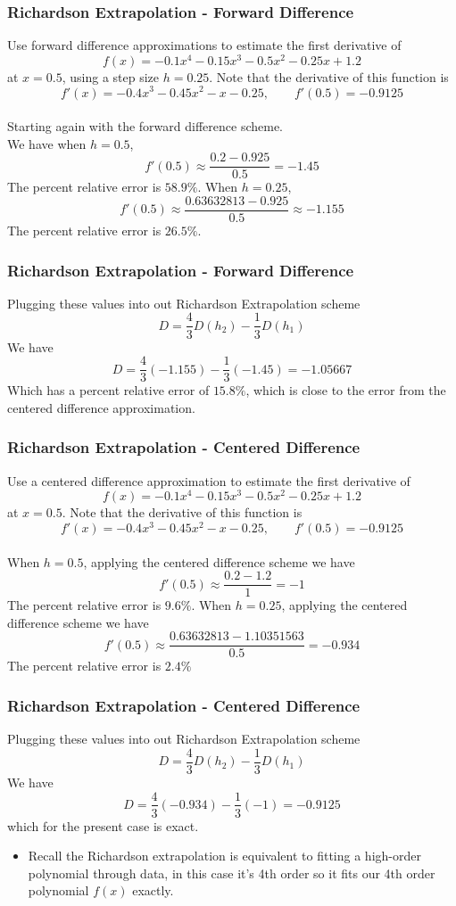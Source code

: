 \documentclass{if-beamer}
\begin{document}
\begin{frame}
	\frametitle{Richardson Extrapolation - Forward Difference}
	Use forward difference approximations to estimate the first derivative of
	$$f(x) = -0.1x^4-0.15x^3-0.5x^2-0.25x+1.2 $$
	at $x=0.5$, using a step size $h = 0.25$. Note that the derivative of this function is
	$$f'(x) = -0.4x^3-0.45x^2-x-0.25, \qquad f'(0.5) = -0.9125$$
	\\\vspace{5pt}
	Starting again with the forward difference scheme.\\\vspace{5pt}
	We have
	when $h=0.5$,
	$$f'(0.5) \approx \frac{0.2-0.925}{0.5} = -1.45$$
	The percent relative error is $58.9\%$.
	When $h = 0.25$,
	$$f'(0.5) \approx \frac{0.63632813-0.925}{0.5} \approx -1.155 $$
	The percent relative error is $26.5\%$.
\end{frame}

\begin{frame}
	\frametitle{Richardson Extrapolation - Forward Difference}
	Plugging these values into out Richardson Extrapolation scheme
	$$D = \frac{4}{3}D(h_2)-\frac{1}{3}D(h_1) $$
	We have
	$$D = \frac{4}{3}(-1.155)-\frac{1}{3}(-1.45) = -1.05667$$
	Which has a percent relative error of $15.8\%$, which is close to the error from the centered difference approximation.
\end{frame}

\begin{frame}
	\frametitle{Richardson Extrapolation - Centered Difference}
	Use a centered difference approximation to estimate the first derivative of
	$$f(x) = -0.1x^4-0.15x^3-0.5x^2-0.25x+1.2 $$
	at $x=0.5$. Note that the derivative of this function is
	$$f'(x) = -0.4x^3-0.45x^2-x-0.25, \qquad f'(0.5) = -0.9125$$
	\\\vspace{5pt}
	When $h=0.5$, applying the centered difference scheme we have
	$$f'(0.5) \approx \frac{0.2-1.2}{1} = -1 $$
	The percent relative error is $9.6\%$.
	When $h=0.25$, applying the centered difference scheme we have
	$$f'(0.5) \approx \frac{0.63632813-1.10351563}{0.5} = -0.934$$
	The percent relative error is $2.4\%$
\end{frame}

\begin{frame}
	\frametitle{Richardson Extrapolation - Centered Difference}
	Plugging these values into out Richardson Extrapolation scheme
	$$D = \frac{4}{3}D(h_2)-\frac{1}{3}D(h_1) $$
	We have
	$$D = \frac{4}{3}(-0.934)-\frac{1}{3}(-1) = -0.9125$$
	which for the present case is exact.
	\begin{itemize}
		\item Recall the Richardson extrapolation is equivalent to fitting a high-order polynomial through data, in this case it's 4th order so it fits our 4th order polynomial $f(x)$ exactly.
	\end{itemize}
\end{frame}
\end{document}

